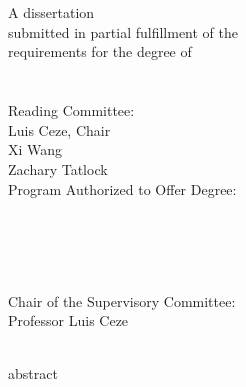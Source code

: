 \documentclass[ twoside,openright,titlepage,numbers=noenddot,headinclude,
                footinclude=true,cleardoublepage=empty,abstractoff,%
                BCOR=5mm,paper=letter,fontsize=11pt,letterpaper,%
                american,%
                ]{scrreprt}
\begin{document}
\raggedbottom
{}
\pagestyle{plain}

\begin{titlepage}
    \begin{addmargin}[-1cm]{-3cm}
    \begin{center}
        \large
        \hfill
        \vfill
        \begingroup
             \\
             \\ \bigskip
        \endgroup
        \vfill
        A dissertation \\
        submitted in partial fulfillment of the \\
        requirements for the degree of \\
        \medskip
         \\
        \bigskip
         \\
        \smallskip
        \vfill
        Reading Committee: \\ 
        \smallskip
        Luis Ceze, Chair \\
        \smallskip
        Xi Wang \\
        \smallskip
        Zachary Tatlock \\
        \vfill
        Program Authorized to Offer Degree: \\
        \smallskip
    \end{center}
  \end{addmargin}
\end{titlepage}


\cleardoublepage
\thispagestyle{empty}
\begin{center}
     \\
    \bigskip
    {\color{thecolor}
     \\
     \\
    }
    \bigskip
     \\
    \bigskip
    Chair of the Supervisory Committee: \\
    Professor Luis Ceze \\
     \\
    \bigskip
\end{center}
{abstract}
\end{document}
